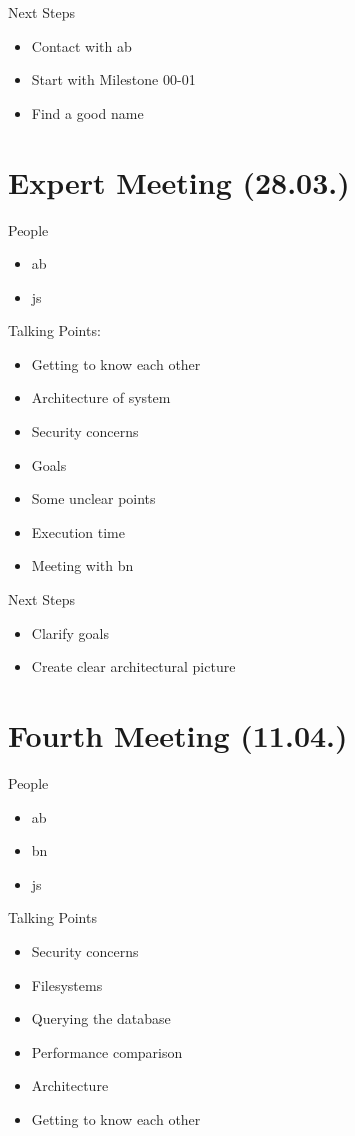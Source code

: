 Next Steps
\begin{itemize}
    \item Contact with \gls{ab}
    \item Start with Milestone 00-01
    \item Find a good name
\end{itemize}

\section{Expert Meeting (28.03.)}
\label{sec:meetingexpert}

People
\begin{itemize}
    \item \gls{ab}
    \item \gls{js}
\end{itemize}

Talking Points:
\begin{itemize}
    \item Getting to know each other
    \item Architecture of system
    \item Security concerns
    \item Goals
    \item Some unclear points
    \item Execution time
    \item Meeting with \gls{bn}
\end{itemize}

Next Steps
\begin{itemize}
    \item Clarify goals
    \item Create clear architectural picture
\end{itemize}

\section{Fourth Meeting (11.04.)}
\label{sec:meeting04}

People
\begin{itemize}
    \item \gls{ab}
    \item \gls{bn}
    \item \gls{js}
\end{itemize}

Talking Points
\begin{itemize}
    \item Security concerns
    \item Filesystems
    \item Querying the database
    \item Performance comparison
    \item Architecture
    \item Getting to know each other
\end{itemize}

